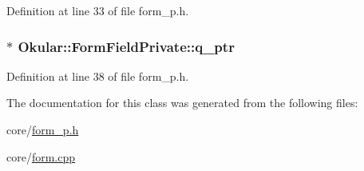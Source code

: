 Definition at line 33 of file form\+\_\+p.\+h.

\hypertarget{classOkular_1_1FormFieldPrivate_ad76633424a6e8e97b8c6dd1a3bbae4e0}{
\subsubsection[{q\+\_\+ptr}]{$\ast$ Okular\+::\+Form\+Field\+Private\+::q\+\_\+ptr}}\label{classOkular_1_1FormFieldPrivate_ad76633424a6e8e97b8c6dd1a3bbae4e0}


Definition at line 38 of file form\+\_\+p.\+h.



The documentation for this class was generated from the following files\+:\begin{DoxyCompactItemize}
\item 
core/\hyperlink{form__p_8h}{form\+\_\+p.\+h}\item 
core/\hyperlink{form_8cpp}{form.\+cpp}\end{DoxyCompactItemize}
